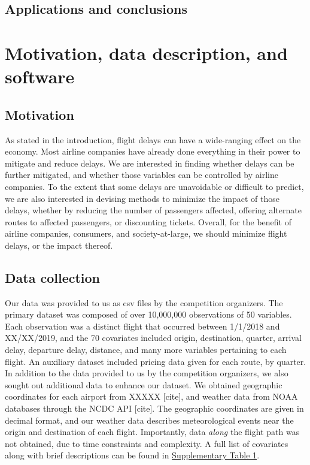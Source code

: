 \documentclass[12pt, a4paper]{book}
\newcommand\tab[1][1cm]{\hspace*{#1}}
\begin{document}
	\section{Applications and conclusions}
	
\chapter{Motivation, data description, and software}
	\section{Motivation}
	\tab As stated in the introduction, flight delays can have a wide-ranging effect on the economy. Most airline companies have already done everything in their power to mitigate and reduce delays. We are interested in finding whether delays can be further mitigated, and whether those variables can be controlled by airline companies. To the extent that some delays are unavoidable or difficult to predict, we are also interested in devising methods to minimize the impact of those delays, whether by reducing the number of passengers affected, offering alternate routes to affected passengers, or discounting tickets. Overall, for the benefit of airline companies, consumers, and society-at-large, we should minimize flight delays, or the impact thereof. 
	\section{Data collection}
	\tab Our data was provided to us as csv files by the competition organizers. The primary dataset was composed of over 10,000,000 observations of 50 variables. Each observation was a distinct flight that occurred between 1/1/2018 and XX/XX/2019, and the 70 covariates included origin, destination, quarter, arrival delay, departure delay, distance, and many more variables pertaining to each flight. An auxiliary dataset included pricing data given for each route, by quarter. \\
	\tab In addition to the data provided to us by the competition organizers, we also sought out additional data to enhance our dataset. We obtained geographic coordinates for each airport from XXXXX [cite], and weather data from NOAA databases through the NCDC API [cite]. The geographic coordinates are given in decimal format, and our weather data describes meteorological events near the origin and destination of each flight. Importantly, data \textit{along} the flight path was not obtained, due to time constraints and complexity. A full list of covariates along with brief descriptions can be found in \underline{Supplementary Table 1}. 
\end{document}
